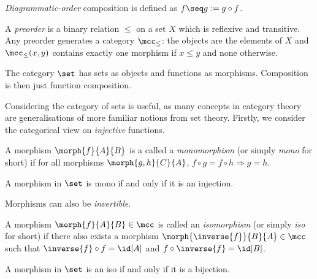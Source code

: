 \begin{notation}
    \emph{Diagrammatic-order} composition is defined as
    \(f \seq g := g \circ f\).
\end{notation}

\begin{example}[Preorder]
    A \emph{preorder} is a binary relation \(\leq\) on a set \(X\) which is
    reflexive and transitive.
    Any preorder generates a category \(\mcc_\leq\): the objects are the
    elements of \(X\) and \(\mcc_\leq(x, y)\) contains exactly one morphism if
    \(x \leq y\) and none otherwise.
\end{example}

\begin{example}
    The category \(\set\) has sets as objects and functions as morphisms.
    Composition is then just function composition.
\end{example}

Considering the category of sets is useful, as many concepts in category theory
are generalisations of more familiar notions from set theory.
Firstly, we consider the categorical view on \emph{injective} functions.

\begin{definition}[Monomorphism]
    A morphism \(\morph{f}{A}{B}\) is a called a \emph{monomorphism} (or simply
    \emph{mono} for short) if for all morphisms \(\morph{g,h}{C}{A}\), \(
        f \circ g = f \circ h \Rightarrow g = h
    \).
\end{definition}

\begin{example}
    A morphism in \(\set\) is mono if and only if it is an injection.
\end{example}

Morphisms can also be \emph{invertible}.

\begin{definition}[Isomorphism]
    A morphism \(\morph{f}{A}{B} \in \mcc\) is called an \emph{isomorphism} (or
    simply \emph{iso} for short) if there also exists a morphism \(
        \morph{\inverse{f}}{B}{A} \in \mcc
    \) such that \(
        \inverse{f} \circ f = \id[A]
    \) and \(
        f \circ \inverse{f} = \id[B]
    \).
\end{definition}

\begin{example}
    A morphism in \(\set\) is an iso if and only if it is a bijection.
\end{example}

